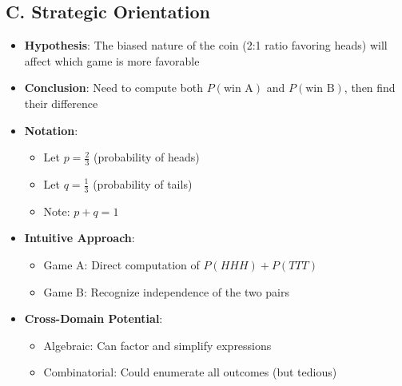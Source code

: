 \documentclass[]{article}
\begin{document}
\begin{problemconfigbox}
\subsection*{C. Strategic Orientation}
\begin{itemize}[leftmargin=*]
    \item \textbf{Hypothesis}: The biased nature of the coin (2:1 ratio favoring heads) will affect which game is more favorable
    \item \textbf{Conclusion}: Need to compute both $P(\text{win A})$ and $P(\text{win B})$, then find their difference
    \item \textbf{Notation}: 
    \begin{itemize}
        \item Let $p = \frac{2}{3}$ (probability of heads)
        \item Let $q = \frac{1}{3}$ (probability of tails)
        \item Note: $p + q = 1$
    \end{itemize}
    \item \textbf{Intuitive Approach}: 
    \begin{itemize}
        \item Game A: Direct computation of $P(HHH) + P(TTT)$
        \item Game B: Recognize independence of the two pairs
    \end{itemize}
    \item \textbf{Cross-Domain Potential}: 
    \begin{itemize}
        \item Algebraic: Can factor and simplify expressions
        \item Combinatorial: Could enumerate all outcomes (but tedious)
    \end{itemize}
\end{itemize}
\end{problemconfigbox}
\end{document}
